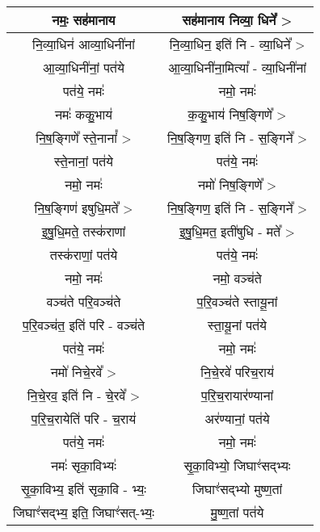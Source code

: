\subsection{}
{\centering
\begin{longtable}{|c|c|}
\hline
नमः॒ सह॑मानाय                & सह॑मानाय निव्या॒ धिने᳚ > \\
\hline
नि॒व्या॒धिन॑ आव्या॒धिनी॑नां        & नि॒व्या॒धिन॒ इति॑ नि - व्या॒धिने᳚ > \\
\hline
आ॒व्या॒धिनी॑नां॒ पत॑ये             & आ॒व्या॒धिनी॑ना॒मित्या᳚ - व्या॒धिनी॑नां \\
\hline
पत॑ये॒ नमः॑                    & नमो॒ नमः॑ \\
\hline
नमः॑ ककु॒भाय॑                  & क॒कु॒भाय॑ निष॒ङ्गिणे᳚ > \\
\hline
नि॒ष॒ङ्गिणे᳚ स्ते॒नानां᳚ >           & नि॒ष॒ङ्गिण॒ इति॑ नि - स॒ङ्गिने᳚ > \\
\hline
स्ते॒नानां॒ पत॑ये                 & पत॑ये॒ नमः॑ \\
\hline
नमो॒ नमः॑                    & नमो॑ निष॒ङ्गिणे᳚ > \\
\hline
नि॒ष॒ङ्गिण॑ इषुधि॒मते᳚ >           & नि॒ष॒ङ्गिण॒ इति॑ नि - स॒ङ्गिने᳚ > \\
\hline
इ॒षु॒धि॒मते॒ तस्क॑राणां             & इ॒षु॒धि॒मत॒ इती॑षुधि - मते᳚ > \\
\hline
तस्क॑राणां॒ पत॑ये                & पत॑ये॒ नमः॑ \\
\hline
नमो॒ नमः॑                    & नमो॒ वञ्च॑ते \\
\hline
वञ्च॑ते परि॒वञ्च॑ते               & प॒रि॒वञ्च॑ते स्तायू॒नां \\
\hline
प॒रि॒वञ्च॑त॒ इति॑ परि - वञ्च॑ते     & स्ता॒यू॒नां पत॑ये \\
\hline
पत॑ये॒ नमः॑                    & नमो॒ नमः॑ \\
\hline
नमो॑ निचे॒रवे᳚ >                & नि॒चे॒रवे॑ परिच॒राय॑ \\
\hline
नि॒चे॒रव॒ इति॑ नि - चे॒रवे᳚ >       & प॒रि॒च॒रायार॑ण्यानां \\
\hline
प॒रि॒च॒रायेति॑ परि - च॒राय॑       & अर॑ण्यानां॒ पत॑ये \\
\hline
पत॑ये॒ नमः॑                    & नमो॒ नमः॑ \\
\hline
नमः॑ सृका॒विभ्यः॑               & सृ॒का॒विभ्यो॒ जिघाꣳ॑सद्भ्यः \\
\hline
सृ॒का॒विभ्य॒ इति॑ सृका॒वि - भ्यः॒    & जिघाꣳ॑सद्भ्यो मुष्ण॒तां \\
\hline
जिघाꣳ॑सद्भ्य॒ इति॒ जिघाꣳ॑सत्-भ्यः॒  & मु॒ष्ण॒तां पत॑ये \\

\end{longtable}}
